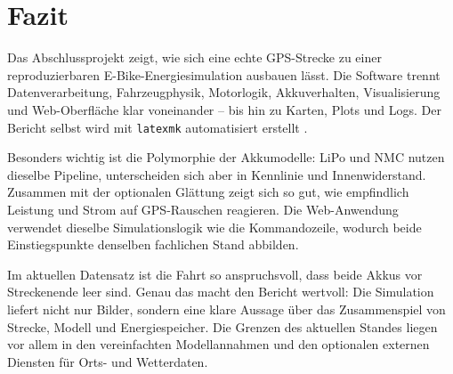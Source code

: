\chapter{Fazit}
\label{ch:fazit}

Das Abschlussprojekt zeigt, wie sich eine echte GPS-Strecke zu einer reproduzierbaren E-Bike-Energiesimulation ausbauen lässt. Die Software trennt Datenverarbeitung, Fahrzeugphysik, Motorlogik, Akkuverhalten, Visualisierung und Web-Oberfläche klar voneinander -- bis hin zu Karten, Plots und Logs. Der Bericht selbst wird mit \texttt{latexmk} automatisiert erstellt \cite{latexmk_docs}.

Besonders wichtig ist die Polymorphie der Akkumodelle: LiPo und NMC nutzen dieselbe Pipeline, unterscheiden sich aber in Kennlinie und Innenwiderstand. Zusammen mit der optionalen Glättung zeigt sich so gut, wie empfindlich Leistung und Strom auf GPS-Rauschen reagieren. Die Web-Anwendung verwendet dieselbe Simulationslogik wie die Kommandozeile, wodurch beide Einstiegspunkte denselben fachlichen Stand abbilden.

Im aktuellen Datensatz ist die Fahrt so anspruchsvoll, dass beide Akkus vor Streckenende leer sind. Genau das macht den Bericht wertvoll: Die Simulation liefert nicht nur Bilder, sondern eine klare Aussage über das Zusammenspiel von Strecke, Modell und Energiespeicher. Die Grenzen des aktuellen Standes liegen vor allem in den vereinfachten Modellannahmen und den optionalen externen Diensten für Orts- und Wetterdaten.